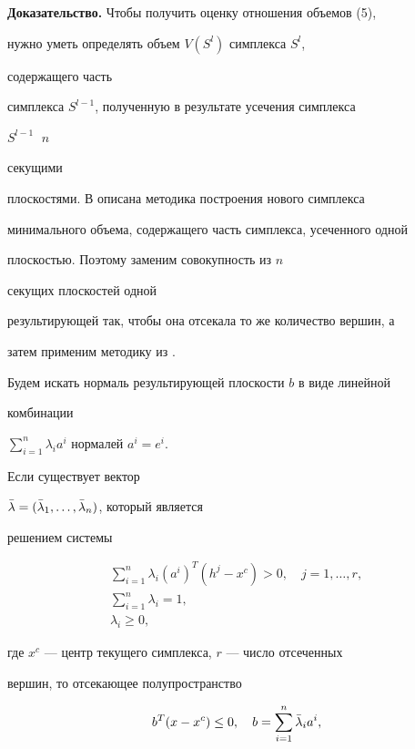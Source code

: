 {\bf Доказательство.} Чтобы получить оценку отношения объемов (5),


нужно уметь определять объем $V(S^l)$ симплекса $S^l$,


содержащего часть


симплекса $S^{l-1}$, полученную в результате усечения симплекса


$S^{l-1}\;$ $n$


секущими


плоскостями. В \cite{An} описана методика построения нового симплекса


минимального объема, содержащего часть симплекса, усеченного одной


плоскостью. Поэтому заменим совокупность из $n$


секущих плоскостей одной


результирующей так, чтобы она отсекала то же количество вершин, а


затем применим методику из \cite{An}.





Будем искать нормаль результирующей плоскости $b$ в виде линейной


комбинации


$\sum\limits^n_{i=1}\lambda_ia^i$ нормалей $a^i=e^i$.





Если существует вектор


$\Bar\lambda=(\Bar\lambda_1,\dotsc,\Bar\lambda_n)$, который является


решением системы


\begin{gather}


\sum^n_{i=1}\lambda_i(a^i)^T(h^j-x^c)>0,\quad


j=1,\dotsc,r,\\


\sum^n_{i=1}\lambda_i=1,\\


\lambda_i\ge 0,


\end{gather}


где $x^c$ --- центр текущего симплекса, $r$ --- число отсеченных


вершин, то отсекающее полупространство


$$


b^T(x-x^c)\le 0,\quad b=\sum^n_{i=1}\Bar\lambda_i a^i,


$$


